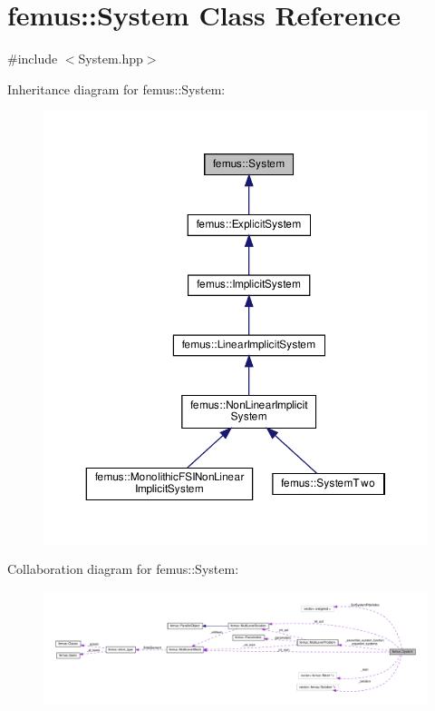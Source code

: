 \hypertarget{classfemus_1_1_system}{}\section{femus\+:\+:System Class Reference}
\label{classfemus_1_1_system}


{\ttfamily \#include $<$System.\+hpp$>$}



Inheritance diagram for femus\+:\+:System\+:
\nopagebreak
\begin{figure}[H]
\begin{center}
\leavevmode
\includegraphics[width=350pt]{classfemus_1_1_system__inherit__graph}
\end{center}
\end{figure}


Collaboration diagram for femus\+:\+:System\+:
\nopagebreak
\begin{figure}[H]
\begin{center}
\leavevmode
\includegraphics[width=350pt]{classfemus_1_1_system__coll__graph}
\end{center}
\end{figure}
